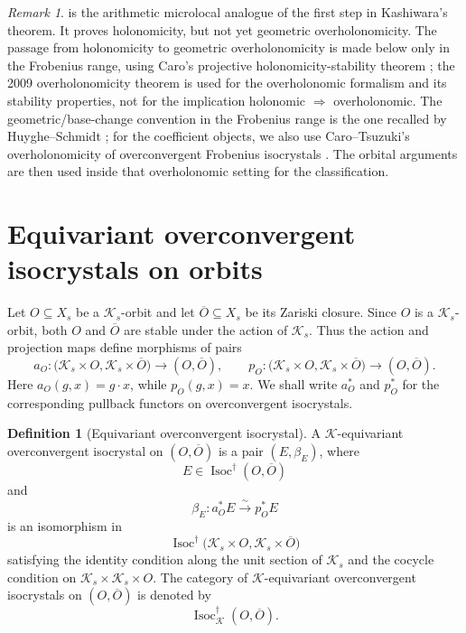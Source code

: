 \documentclass[11pt]{amsart}
\theoremstyle{plain}
\theoremstyle{definition}
\newtheorem{definition}{Definition}[section]
\theoremstyle{remark}
\newtheorem{remark}{Remark}[section]
\newcommand{\Isoc}{\operatorname{Isoc}}
\begin{document}
\begin{remark}
\label{rem:holonomic-not-yet-overholonomic}
 is the arithmetic microlocal analogue
of the first step in Kashiwara's theorem.  It proves holonomicity, but not yet
geometric overholonomicity.  The passage from holonomicity to geometric
overholonomicity is made below only in the Frobenius range, using Caro's
projective holonomicity-stability theorem \cite[\S2.1]{CaroStabiliteHolonomie};
the 2009 overholonomicity theorem \cite{CaroSurholonomie} is used for the overholonomic formalism and
its stability properties, not for the implication holonomic \(\Rightarrow\) overholonomic.
The geometric/base-change convention in the Frobenius range is the one recalled
by Huyghe--Schmidt \cite[\S2.1, first paragraphs]{HuygheSchmidtIntermediate};
for the coefficient objects, we also use Caro--Tsuzuki's overholonomicity of
overconvergent Frobenius isocrystals \cite[Abstract and Introduction]{CaroTsuzukiOverholonomicity}.
The orbital arguments are then used inside that overholonomic setting for the
classification.
\end{remark}

\section{Equivariant overconvergent isocrystals on orbits}
\label{sec:isocrystals}

Let \(O\subseteq X_s\) be a \(\mathcal K_s\)-orbit and let
\(\overline O\subseteq X_s\) be its Zariski closure. Since \(O\) is a
\(\mathcal K_s\)-orbit, both \(O\) and \(\overline O\) are stable under the
action of \(\mathcal K_s\). Thus the action and projection maps define
morphisms of pairs
\[
  a_O:
  \bigl(\mathcal K_s\times O,\mathcal K_s\times \overline O\bigr)
  \longrightarrow
  (O,\overline O),
  \qquad
  p_O:
  \bigl(\mathcal K_s\times O,\mathcal K_s\times \overline O\bigr)
  \longrightarrow
  (O,\overline O).
\]
Here \(a_O(g,x)=g\cdot x\), while \(p_O(g,x)=x\). We shall write
\(a_O^*\) and \(p_O^*\) for the corresponding pullback functors on
overconvergent isocrystals.

\begin{definition}[Equivariant overconvergent isocrystal]
\label{def:eq-overconv-isocrystal}
A \(\mathcal K\)-equivariant overconvergent isocrystal on \((O,\overline O)\)
is a pair \((E,\beta_E)\), where
\[
  E\in \Isoc^{\dagger}(O,\overline O)
\]
and
\[
  \beta_E:a_O^*E\xrightarrow{\;\sim\;}p_O^*E
\]
is an isomorphism in
\[
  \Isoc^{\dagger}
  \bigl(\mathcal K_s\times O,\mathcal K_s\times \overline O\bigr)
\]
satisfying the identity condition along the unit section of \(\mathcal K_s\)
and the cocycle condition on \(\mathcal K_s\times\mathcal K_s\times O\). The
category of \(\mathcal K\)-equivariant overconvergent isocrystals on
\((O,\overline O)\) is denoted by
\[
  \Isoc^{\dagger}_{\mathcal K}(O,\overline O).
\]
\end{definition}
\end{document}
